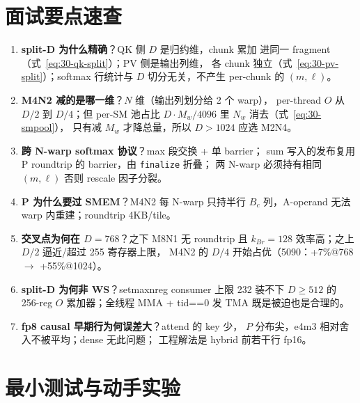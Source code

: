 \section{面试要点速查}

\begin{enumerate}[itemsep=2pt,topsep=2pt]
  \item \textbf{split-D 为什么精确}？QK 侧 $D$ 是归约维，chunk 累加
        进同一 fragment（式~\ref{eq:30-qk-split}）；PV 侧是输出列维，
        各 chunk 独立（式~\ref{eq:30-pv-split}）；softmax 行统计与
        $D$ 切分无关，不产生 per-chunk 的 $(m,\ell)$。
  \item \textbf{M4N2 减的是哪一维}？$N$ 维（输出列划分给 2 个 warp），
        per-thread $O$ 从 $D/2$ 到 $D/4$；但 per-SM 池占比
        $D\cdot M_w/4096$ 里 $N_w$ 消去（式~\ref{eq:30-smpool}），
        只有减 $M_w$ 才降总量，所以 $D>1024$ 应选 M2N4。
  \item \textbf{跨 N-warp softmax 协议}？max 段交换 + 单 barrier；
        sum 写入的发布复用 P roundtrip 的 barrier，由 \texttt{finalize} 折叠；
        两 N-warp 必须持有相同 $(m,\ell)$ 否则 rescale 因子分裂。
  \item \textbf{P 为什么要过 SMEM}？M4N2 每 N-warp 只持半行
        $B_c$ 列，A-operand 无法 warp 内重建；roundtrip 4KB/tile。
  \item \textbf{交叉点为何在 $D=768$}？之下 M8N1 无 roundtrip 且
        $k_{Br}=128$ 效率高；之上 $D/2$ 逼近/超过 255 寄存器上限，
        M4N2 的 $D/4$ 开始占优（5090：+7\%@768 $\to$ +55\%@1024）。
  \item \textbf{split-D 为何非 WS}？setmaxnreg consumer 上限 232
        装不下 $D\ge512$ 的 256-reg $O$ 累加器；全线程 MMA +
        tid==0 发 TMA 既是被迫也是合理的。
  \item \textbf{fp8 causal 早期行为何误差大}？attend 的 key 少，
        $P$ 分布尖，e4m3 相对舍入不被平均；dense 无此问题；
        工程解法是 hybrid 前若干行 fp16。
\end{enumerate}

\section{最小测试与动手实验}

